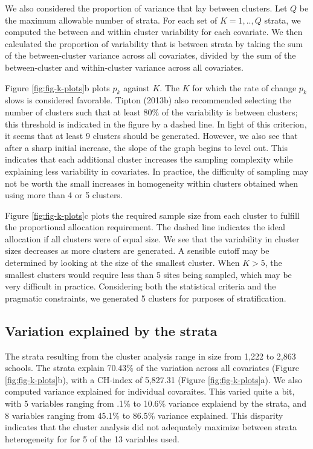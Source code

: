 \documentclass[english,man,floatsintext]{apa6}
\begin{document}
We also considered the proportion of variance that lay between clusters. Let \(Q\) be the maximum allowable number of strata. For each set of \(K = 1,..,Q\) strata, we computed the between and within cluster variability for each covariate. We then calculated the proportion of variability that is between strata by taking the sum of the between-cluster variance across all covariates, divided by the sum of the between-cluster and within-cluster variance across all covariates.

Figure \ref{fig:fig-k-plots}b plots \(p_k\) against \(K\). The \(K\) for which the rate of change \(p_k\) slows is considered favorable. Tipton (2013b) also recommended selecting the number of clusters such that at least 80\% of the variability is between clusters; this threshold is indicated in the figure by a dashed line. In light of this criterion, it seems that at least 9 clusters should be generated. However, we also see that after a sharp initial increase, the slope of the graph begins to level out. This indicates that each additional cluster increases the sampling complexity while explaining less variability in covariates. In practice, the difficulty of sampling may not be worth the small increases in homogeneity within clusters obtained when using more than 4 or 5 clusters.

Figure \ref{fig:fig-k-plots}c plots the required sample size from each cluster to fulfill the proportional allocation requirement. The dashed line indicates the ideal allocation if all clusters were of equal size. We see that the variability in cluster sizes decreases as more clusters are generated. A sensible cutoff may be determined by looking at the size of the smallest cluster. When \(K > 5\), the smallest clusters would require less than 5 sites being sampled, which may be very difficult in practice. Considering both the statistical criteria and the pragmatic constraints, we generated 5 clusters for purposes of stratification.

\hypertarget{variation-explained-by-the-strata}{%
\subsection{Variation explained by the strata}\label{variation-explained-by-the-strata}}

The strata resulting from the cluster analysis range in size from 1,222 to 2,863 schools. The strata explain 70.43\% of the variation across all covariates (Figure \ref{fig:fig-k-plots}b), with a CH-index of 5,827.31 (Figure \ref{fig:fig-k-plots}a). We also computed variance explained for individual covaraites. This varied quite a bit, with 5 variables ranging from .1\% to 10.6\% variance explaiend by the strata, and 8 variables ranging from 45.1\% to 86.5\% variance explained. This disparity indicates that the cluster analysis did not adequately maximize between strata heterogeneity for for 5 of the 13 variables used.  
\end{document}
